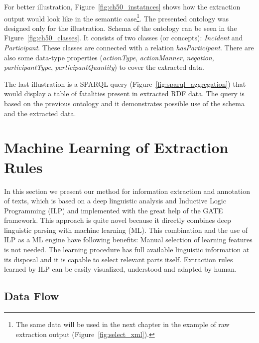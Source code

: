 For better illustration, Figure~\ref{fig:ch50_instatnces} shows how the extraction output would look like in the semantic case\footnote{The same data will be used in the next chapter in the example of raw extraction output (Figure~\ref{fig:select_xml}).}. The presented ontology was designed only for the illustration. Schema of the ontology can be seen in the Figure~\ref{fig:ch50_classes}. It consists of two classes (or concepts): \emph{Incident} and \emph{Participant}. These classes are connected with a relation \emph{hasParticipant}. There are also some data-type properties (\emph{actionType}, \emph{actionManner}, \emph{negation}, \emph{participantType}, \emph{participantQuantity}) to cover the extracted data. 

The last illustration is a SPARQL query (Figure~\ref{fig:sparql_aggregation}) that would display a table of fatalities present in extracted RDF data. The query is based on the previous ontology and it demonstrates possible use of the schema and the extracted data.







\section{Machine Learning of Extraction Rules} \label{sec:methods_learning} \graphicspath{{../img/ch60/}}

In this section we present %
our method for information extraction and annotation of texts, which is based on a deep linguistic analysis and Inductive Logic Programming (ILP) and implemented with the great help of the GATE framework. This approach is quite novel because it directly combines deep linguistic parsing with machine learning (ML). This combination and the use of ILP as a ML engine have following benefits: Manual selection of learning features is not needed. 
The learning procedure has full available linguistic information at its disposal and it is capable to select relevant parts itself. Extraction rules learned by ILP can be easily visualized, understood and adapted by human.


\subsection{Data Flow}


